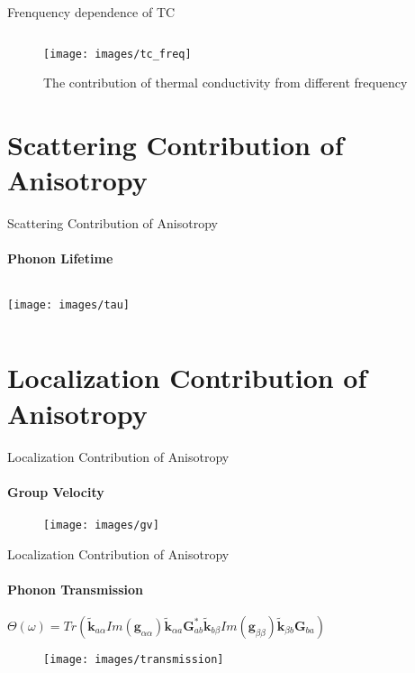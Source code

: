 \documentclass{beamer}
\begin{document}
\begin{frame}{Frenquency dependence of TC}
  \begin{figure}[b]
    \begin{columns}
      \small
      \column{\textwidth}
      \texttt{[image: images/tc\_freq]}
      \caption{\label{fig:freq} The contribution of thermal conductivity from different frequency }
    \end{columns}
  \end{figure}
\end{frame}


\section{Scattering Contribution of Anisotropy}
\begin{frame}{Scattering Contribution of Anisotropy}
  \framesubtitle{Phonon Lifetime}%
  \begin{columns}[onlytextwidth]
    \texttt{[image: images/tau]}

  \end{columns}
\end{frame}


\section{Localization Contribution of Anisotropy}
\begin{frame}{Localization Contribution of Anisotropy}
  \framesubtitle{ Group Velocity}%

  \begin{figure}[h]
    \centering

    \texttt{[image: images/gv]}
  \end{figure}
\end{frame}

\begin{frame}{Localization Contribution of Anisotropy}
  \framesubtitle{ Phonon Transmission}%
  \small
  $\Theta(\omega)= Tr(\mathbf{\widetilde{k}}_{a\alpha} Im(\mathbf{g}_{\alpha\alpha}) \mathbf{\widetilde{k}}_{\alpha a}\mathbf{G}_{a b}^*\mathbf{\widetilde{k}}_{b\beta}Im(\mathbf{g}_{\beta\beta})\mathbf{\widetilde{k}}_{\beta b}\mathbf{G}_{b a} )$
  \begin{figure}[h]
    \centering
    \texttt{[image: images/transmission]}
  \end{figure}
\end{frame}
\end{document}
